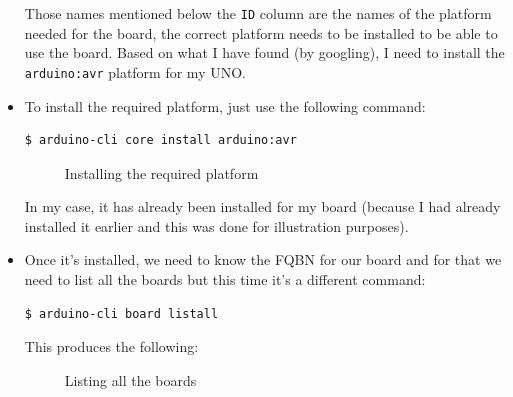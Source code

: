\documentclass{article}
\begin{document}
\begin{itemize}
Those names mentioned below the \lstinline|ID| column are the names of the platform needed for the board, the correct platform needs to be installed to be able to use the board. Based on what I have found (by googling), I need to install the \lstinline|arduino:avr| platform for my UNO.

\item To install the required platform, just use the following command:

\begin{lstlisting}[frame=tLBr, caption=Installing the platform]
$ arduino-cli core install arduino:avr
\end{lstlisting}

\begin{figure}[H]
	\centering
	\caption{Installing the required platform}
	\label{fig:fig3}
\end{figure}

In my case, it has already been installed for my board (because I had already installed it earlier and this was done for illustration purposes).

\item Once it's installed, we need to know the FQBN for our board and for that we need to list all the boards but this time it's a different command:

\begin{lstlisting}[frame=tLBr, caption=Listing all the boards]
	$ arduino-cli board listall
\end{lstlisting}

\pagebreak

This produces the following:

\begin{figure}[H]
	\centering
	\caption{Listing all the boards}
	\label{fig:fig4}
\end{figure}


\end{itemize}
\end{document}
